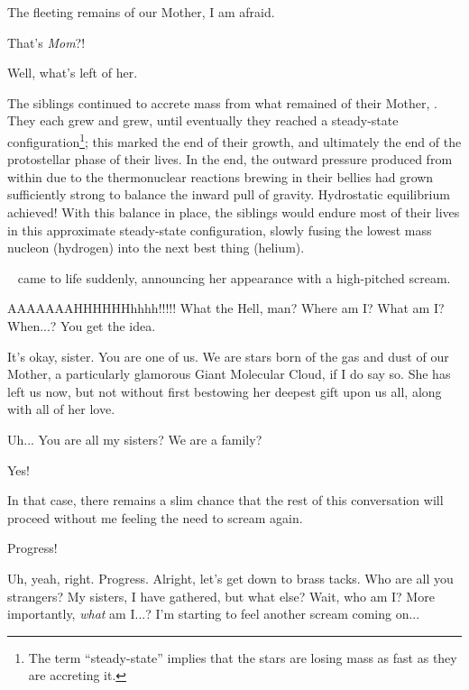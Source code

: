 \documentclass[main.tex]{subfiles}
\begin{document}
\par \Maia The fleeting remains of our Mother, I am afraid.

\par \Electra That's \textit{Mom}?!

\par \Maia Well, what's left of her.

\par \nar The siblings continued to accrete mass from what remained of their Mother, \rmpleione.  They each grew and grew, until eventually they reached a steady-state configuration\footnote{The term ``steady-state'' implies that the stars are losing mass as fast as they are accreting it.}; this marked the end of their growth, and ultimately the end of the protostellar phase of their lives.  In the end, the outward pressure produced from within due to the thermonuclear reactions brewing in their bellies had grown sufficiently strong to balance the inward pull of gravity.  Hydrostatic equilibrium achieved!  With this balance in place, the siblings would endure most of their lives in this approximate steady-state configuration, slowly fusing the lowest mass nucleon (hydrogen) into the next best thing (helium).

\par \nar \rmsterope~ came to life suddenly, announcing her appearance with a high-pitched scream.

\par \Sterope AAAAAAAHHHHHHhhhh!!!!!  What the Hell, man?  Where am I?  What am I?  When...?  You get the idea.

\par \Maia It's okay, sister.  You are one of us.  We are stars born of the gas and dust of our Mother, a particularly glamorous Giant Molecular Cloud, if I do say so.  She has left us now, but not without first bestowing her deepest gift upon us all, along with all of her love.

\par \Sterope  Uh... You are all my sisters?  We are a family?

\par \Maia Yes!

\par \Sterope  In that case, there remains a slim chance that the rest of this conversation will proceed without me feeling the need to scream again.

\par \Maia Progress!

\par \Sterope Uh, yeah, right.  Progress.  Alright, let's get down to brass tacks.  Who are all you strangers?  My sisters, I have gathered, but what else?  Wait, who am I?  More importantly, \textit{what} am I...?  I'm starting to feel another scream coming on...
\end{document}
